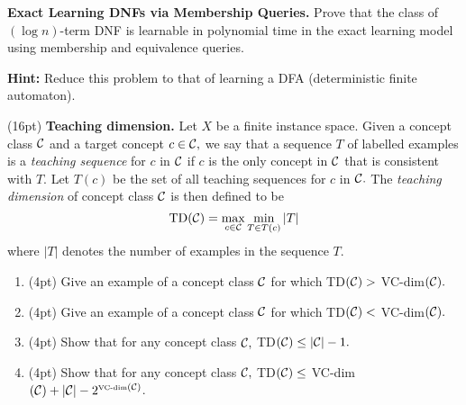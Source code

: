 \documentclass[11pt]{article}
\DeclareMathOperator{\1}{\mathbbm{1}}
\begin{document}
\begin{problem}[15 pts] \textbf{Exact Learning DNFs via Membership Queries.} Prove that the class of $(\log n)$-term DNF is learnable in polynomial time in the exact learning model using membership and equivalence queries.

\textbf{Hint:} Reduce this problem to that of learning a DFA (deterministic finite automaton).
\end{problem}


\begin{problem} (16pt) \textbf{Teaching dimension.} 
Let $X$ be a finite instance space.  Given a concept class ${\cal C}$ and a
target concept $c \in {\cal C},$  we say that a sequence $T$ of labelled
examples is a {\em teaching sequence} for $c$ in ${\cal C}$ if $c$ is the only
concept in ${\cal C}$ that is consistent with $T$. Let $T(c)$ be the set of all
teaching sequences for $c$ in ${\cal C}.$  The {\em teaching dimension} of
concept class ${\cal C}$ is then defined to be
%
\[ \mbox{TD}({\cal C}) = \max_{c \in {\cal C}} \min_{T \in T(c)} |T| \] 
%
where $|T|$ denotes the number of examples in the sequence $T$.
\begin{enumerate}
\item (4pt) Give an example of a concept class ${\cal C}$ for which TD$({\cal C})
> $ VC-dim$({\cal C}).$
\item (4pt) Give an example of a concept class ${\cal C}$ for which TD$({\cal C})
< $ VC-dim$({\cal C}).$
\item (4pt) Show that for any concept class ${\cal C},$ TD$({\cal C}) \leq |{\cal
C}|-1.$
\item (4pt) Show that for any concept class ${\cal C},$ TD$({\cal C}) \leq $
VC-dim$({\cal C}) + |{\cal C}|- 2^{\mbox{\tiny{VC-dim}} ({\cal C})}$.
\end{enumerate}

\end{problem}
\end{document}
